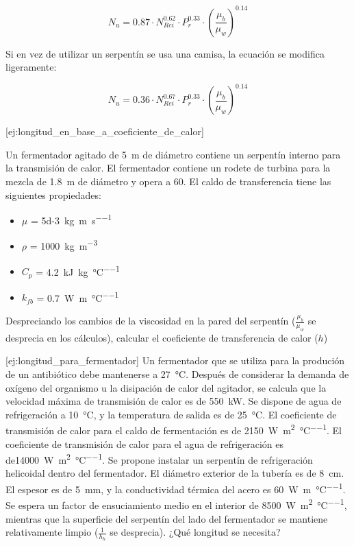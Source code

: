 \documentclass{AsignaturaResumen}
\begin{document}
\begin{equation}
    N_{u} = 0.87 \cdot N_{Rei}^{0.62} \cdot P_{r}^{0.33} \cdot (\frac{\mu_{b}}{\mu_{w}})^{0.14}
\end{equation}

Si en vez de utilizar un serpentín se usa una camisa, la ecuación se modifica ligeramente:

\begin{equation}
    N_{u} = 0.36 \cdot N_{Rei}^{0.67} \cdot P_{r}^{0.33} \cdot (\frac{\mu_{b}}{\mu_{w}})^{0.14}
\end{equation}

[ej:longitud_en_base_a_coeficiente_de_calor]{
    Un fermentador agitado de \qty{5}{\m} de diámetro contiene un serpentín interno para la transmisión de calor. El fermentador contiene un rodete de turbina para la mezcla de \qty{1.8}{\m} de diámetro y opera a \qty{60}{\rpm}. El caldo de transferencia tiene las siguientes propiedades:
    \begin{itemize}
        \item $\mu$ = \qty{5d-3}{\kg\per\m\per\s}
        \item $\rho$ = \qty{1000}{\kg\per\m\cubed}
        \item $C_{p}$ = \qty{4.2}{\kilo\J\per\kg\per\degreeCelsius}
        \item $k_{fb}$ = \qty{0.7}{\watt\per\m\per\degreeCelsius}
    \end{itemize}
    Despreciando los cambios de la viscosidad en la pared del serpentín ($\frac{\mu_{b}}{\mu_{w}}$ se desprecia en los cálculos), calcular el coeficiente de transferencia de calor ($h$)
}

[ej:longitud_para_fermentador]{
    Un fermentador que se utiliza para la produción de un antibiótico debe mantenerse a \qty{27}{\degreeCelsius}. Después de considerar la demanda de oxígeno del organismo u la disipación de calor del agitador, se calcula que la velocidad máxima de transmisión de calor es de \qty{550}{\kilo\watt}. Se dispone de agua de refrigeración a \qty{10}{\degreeCelsius}, y la temperatura de salida es de \qty{25}{\degreeCelsius}. El coeficiente de transmisión de calor para el caldo de fermentación es de \qty{2150}{\watt\per\m\squared\per\degreeCelsius}. El coeficiente de transmisión de calor para el agua de refrigeración es de\qty{14000}{\watt\per\m\squared\per\degreeCelsius}. Se propone instalar un serpentín de refrigeración helicoidal dentro del fermentador. El diámetro exterior de la tubería es de \qty{8}{\cm}. El espesor es de \qty{5}{\mm}, y la conductividad térmica del acero es \qty{60}{\watt\per\m\per\degreeCelsius}. Se espera un factor de ensuciamiento medio en el interior de \qty{8500}{\watt\per\m\squared\per\degreeCelsius}, mientras que la superficie del serpentín del lado del fermentador se mantiene relativamente limpio ($\frac{1}{h_{h}}$ se desprecia). ¿Qué longitud se necesita?
}



\ifx\ISMAIN\undefined
    
\end{document}
